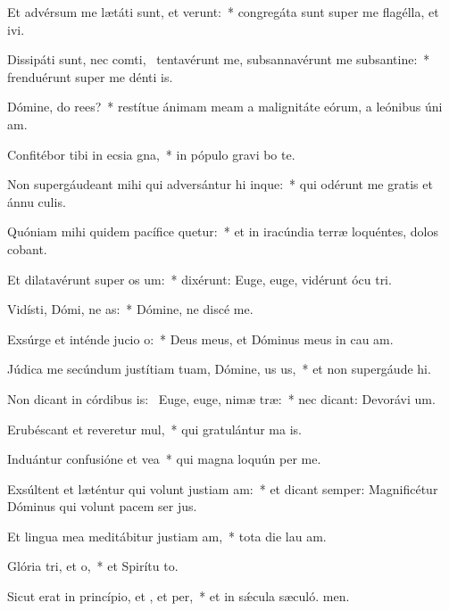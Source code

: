 \item Et advérsum me lætáti sunt, et verunt:~* congregáta sunt super me flagélla, et ivi.
\item Dissipáti sunt, nec comti,~\pscross{} tentavérunt me, subsannavérunt me subsantine:~* frenduérunt super me dénti is.
\item Dómine, do rees?~* restítue ánimam meam a malignitáte eórum, a leónibus úni am.
\item Confitébor tibi in ecsia gna,~* in pópulo gravi bo te.
\item Non supergáudeant mihi qui adversántur hi inque:~* qui odérunt me gratis et ánnu culis.
\item Quóniam mihi quidem pacífice quetur:~* et in iracúndia terræ loquéntes, dolos cobant.
\item Et dilatavérunt super  os um:~* dixérunt: Euge, euge, vidérunt ócu tri.
\item Vidísti, Dómi, ne as:~* Dómine, ne discé  me.
\item Exsúrge et inténde jucio o:~* Deus meus, et Dóminus meus in cau am.
\item Júdica me secúndum justítiam tuam, Dómine, us us,~* et non supergáude hi.
\item Non dicant in córdibus is:~\pscross{} Euge, euge, nimæ træ:~* nec dicant: Devorávi um.
\item Erubéscant et reveretur mul,~* qui gratulántur ma is.
\item Induántur confusióne et vea~* qui magna loquún per me.
\item Exsúltent et læténtur qui volunt justiam am:~* et dicant semper: Magnificétur Dóminus qui volunt pacem ser jus.
\item Et lingua mea meditábitur justiam am,~* tota die lau am.
\item Glória tri, et o,~* et Spirítu to.
\item Sicut erat in princípio, et , et per,~* et in sǽcula sæculó. men.
